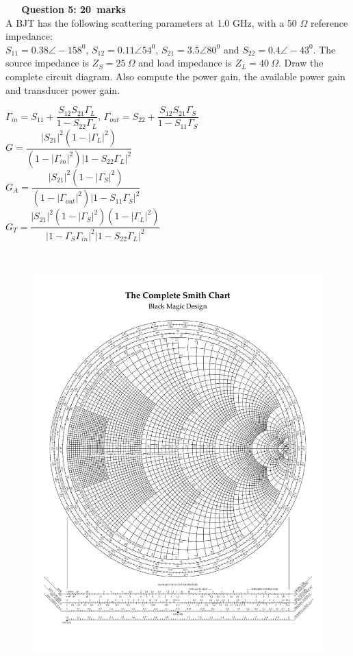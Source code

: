 \documentclass[12pt,a4paper]{article}
\def\Qfive{20}
\begin{document}
\newpage~
\newpage~
\newpage
\noindent\textbf{Question 5: \hfill \Qfive~marks}\\
A BJT has the following scattering parameters at 1.0 GHz, with a 50 $\Omega$ reference impedance:\\$S_{11}=0.38\angle-158^0$, $S_{12}=0.11\angle54^0$, $S_{21}=3.5\angle80^0$ and $S_{22}=0.4\angle-43^0$. The source impedance is $Z_S=25~\Omega$ and load impedance is $Z_L=40~\Omega$. Draw the complete circuit diagram. Also compute the power gain, the available power gain and transducer power gain.\\
\begin{flushleft}
$\Gamma_{in}=S_{11}+\dfrac{S_{12}S_{21}\Gamma_L}{1-S_{22}\Gamma_L}$, $\Gamma_{out}=S_{22}+\dfrac{S_{12}S_{21}\Gamma_S}{1-S_{11}\Gamma_S}$\\[0.3cm]
$G=\dfrac{|S_{21}|^2(1-|\Gamma_L|^2)}{(1-|\Gamma_{in}|^2)|1-S_{22}\Gamma_L|^2}$\\[0.3cm]
$G_A=\dfrac{|S_{21}|^2(1-|\Gamma_S|^2)}{(1-|\Gamma_{out}|^2)|1-S_{11}\Gamma_S|^2}$\\[0.3cm]
$G_T=\dfrac{|S_{21}|^2(1-|\Gamma_S|^2)(1-|\Gamma_L|^2)}{|1-\Gamma_S\Gamma_{in}|^2|1-S_{22}\Gamma_L|^2}$\\
\end{flushleft}
\newpage~
\newpage~
\newpage~
\newpage
\begin{figure}[H]
\centering
\vspace{4cm}
\hspace*{-1.6cm}
\includegraphics[scale=1.0,trim=1cm 2cm 1cm 3cm, clip]{./SmithChart}
\label{fig:SmithChart3}
\end{figure}
\end{document}
